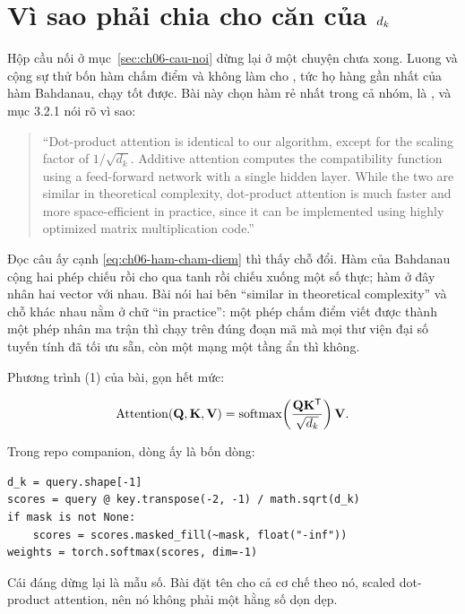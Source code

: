 \section{Vì sao phải chia cho căn của \texorpdfstring{\(d_{k}\)}{d k}}
\label{sec:ch07-chia-can}

%
Hộp cầu nối ở mục~\ref{sec:ch06-cau-noi} dừng lại ở một chuyện chưa xong. Luong
và cộng sự thử bốn hàm chấm điểm và không làm cho , tức họ hàng gần
nhất của hàm Bahdanau, chạy tốt được. Bài này chọn hàm rẻ nhất trong cả nhóm,
là , và mục 3.2.1 nói rõ vì sao:

\begin{quote}
\enquote{Dot-product attention is identical to our algorithm, except for the
scaling factor of \(1/\sqrt{d_k}\). Additive attention computes the
compatibility function using a feed-forward network with a single hidden layer.
While the two are similar in theoretical complexity, dot-product attention is
much faster and more space-efficient in practice, since it can be implemented
using highly optimized matrix multiplication code.}
\end{quote}

Đọc câu ấy cạnh \eqref{eq:ch06-ham-cham-diem} thì thấy chỗ đổi. Hàm của Bahdanau
cộng hai phép chiếu rồi cho qua tanh rồi chiếu xuống một số thực; hàm ở đây nhân
hai vector với nhau. Bài nói hai bên \enquote{similar in theoretical
complexity} và chỗ khác nhau nằm ở chữ \enquote{in practice}: một phép chấm
điểm viết được thành một phép nhân ma trận thì chạy trên đúng đoạn mã mà mọi
thư viện đại số tuyến tính đã tối ưu sẵn, còn một mạng một tầng ẩn thì không.

Phương trình (1) của bài, gọn hết mức:

\begin{equation}
  \operatorname{Attention}(\mathbf{Q}, \mathbf{K}, \mathbf{V})
  = \operatorname{softmax}\!\left( \frac{\mathbf{Q}\mathbf{K}^{\mathsf{T}}}{\sqrt{d_{k}}} \right) \mathbf{V}.
  \label{eq:ch07-attention}
\end{equation}

Trong repo companion, dòng ấy là bốn dòng:

\begin{verbatim}
d_k = query.shape[-1]
scores = query @ key.transpose(-2, -1) / math.sqrt(d_k)
if mask is not None:
    scores = scores.masked_fill(~mask, float("-inf"))
weights = torch.softmax(scores, dim=-1)
\end{verbatim}

Cái đáng dừng lại là mẫu số. Bài đặt tên cho cả cơ chế theo nó, scaled
dot-product attention, nên nó không phải một hằng số dọn dẹp.

